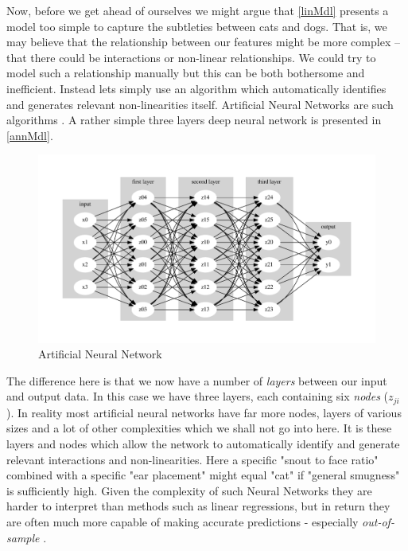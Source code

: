 \documentclass[a4paper]{article}
\begin{document}
Now, before we get ahead of ourselves we might argue that \autoref{linMdl} presents a model too simple to capture the subtleties between cats and dogs. That is, we may believe that the relationship between our features might be more complex -- that there could be interactions or non-linear relationships. We could try to model such a relationship manually but this can be both bothersome and inefficient. Instead lets simply use an algorithm which automatically identifies and generates relevant non-linearities itself. Artificial Neural Networks are such algorithms \cite{francois2017deep, williams2019images}. A rather simple three layers deep neural network is presented in \autoref{annMdl}.\par

\begin{figure}[!htb]
	\centering
	\caption{Artificial Neural Network}\label{annMdl}
	\includegraphics[scale=0.65]{annMdl.pdf}
\end{figure}

The difference here is that we now have a number of \emph{layers} between our input and output data. In this case we have three layers, each containing six \emph{nodes} ($z_{ji}$). In reality most artificial neural networks have far more nodes, layers of various sizes and a lot of other complexities which we shall not go into here. It is these layers and nodes which allow the network to automatically identify and generate relevant interactions and non-linearities. Here a specific "snout to face ratio" combined with a specific "ear placement" might equal "cat" if "general smugness" is sufficiently high. Given the complexity of such Neural Networks they are harder to interpret than methods such as linear regressions, but in return they are often much more capable of making accurate predictions - especially \emph{out-of-sample} \cite{williams2019images}.
\end{document}
